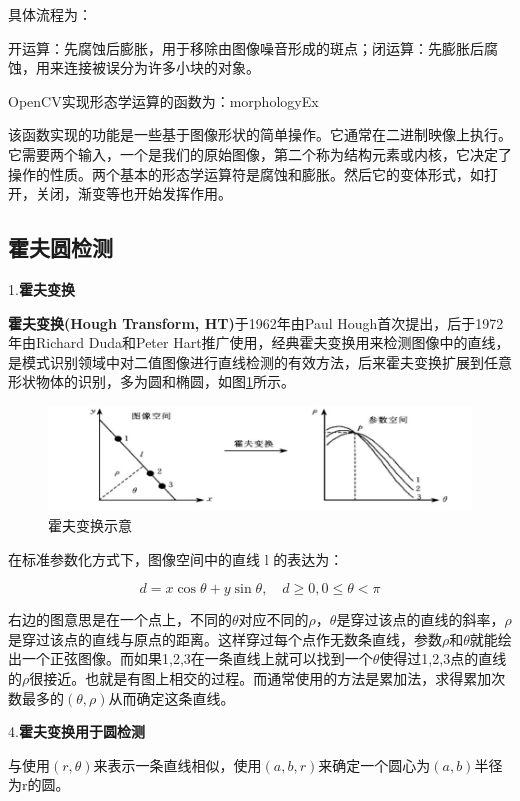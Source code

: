 具体流程为：

开运算：先腐蚀后膨胀，用于移除由图像噪音形成的斑点；闭运算：先膨胀后腐蚀，用来连接被误分为许多小块的对象。

OpenCV实现形态学运算的函数为：morphologyEx

该函数实现的功能是一些基于图像形状的简单操作。它通常在二进制映像上执行。它需要两个输入，一个是我们的原始图像，第二个称为结构元素或内核，它决定了操作的性质。两个基本的形态学运算符是腐蚀和膨胀。然后它的变体形式，如打开，关闭，渐变等也开始发挥作用。

\subsection{霍夫圆检测}

1.\textbf{霍夫变换}

\textbf{霍夫变换(Hough Transform, HT)}于1962年由Paul Hough首次提出，后于1972年由Richard Duda和Peter Hart推⼴使⽤，经典霍夫变换⽤来检测图像中的直线，是模式识别领域中对二值图像进行直线检测的有效方法\cite{Art2}，后来霍夫变换扩展到任意形状物体的识别，多为圆和椭圆，如图\ref{Fig:img1}所示。

\begin{figure}[ht]
  \centering
  \includegraphics[width=0.8\linewidth]{./Figure/Hough_Transform.png}
  \caption{霍夫变换示意}\label{Fig:img1}
\end{figure}

在标准参数化方式下，图像空间中的直线 l 的表达为：

\begin{equation}
d=x \cos \theta+y \sin \theta, \quad d \geqslant 0,0 \leqslant \theta<\pi
\end{equation}

右边的图意思是在一个点上，不同的$\theta$对应不同的$\rho$，$\theta$是穿过该点的直线的斜率，$\rho$是穿过该点的直线与原点的距离。这样穿过每个点作无数条直线，参数$\rho$和$\theta$就能绘出一个正弦图像。而如果1,2,3在一条直线上就可以找到⼀个$\theta$使得过1,2,3点的直线的$\rho$很接近。也就是有图上相交的过程。而通常使用的方法是累加法，求得累加次数最多的$(\theta, \rho)$从而确定这条直线。

4.\textbf{霍夫变换用于圆检测}

与使用$(r, \theta)$来表示一条直线相似，使用$(a, b, r)$来确定一个圆心为$(a, b)$半径为r的圆。

